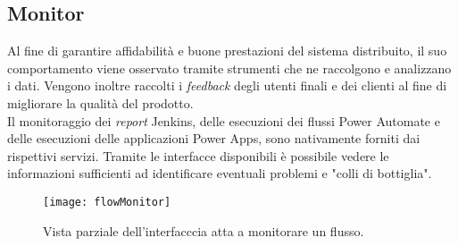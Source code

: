 \subsection{Monitor}
Al fine di garantire affidabilità e buone prestazioni del sistema distribuito, il suo comportamento viene osservato tramite strumenti che ne raccolgono e analizzano i dati. 
Vengono inoltre raccolti i \emph{feedback} degli utenti finali e dei clienti al fine di migliorare la qualità del prodotto.\\
Il monitoraggio dei \emph{report} Jenkins, delle esecuzioni dei flussi Power Automate e delle esecuzioni delle applicazioni Power Apps, sono nativamente forniti dai rispettivi servizi.
Tramite le interfacce disponibili è possibile vedere le informazioni sufficienti ad identificare eventuali problemi e "colli di bottiglia".
\begin{figure}[htbp] 
    \centering 
    \texttt{[image: flowMonitor]} 
    \caption{Vista parziale dell'interfacccia atta a monitorare un flusso.}
    \label{fig:flowMonitor}
\end{figure}


